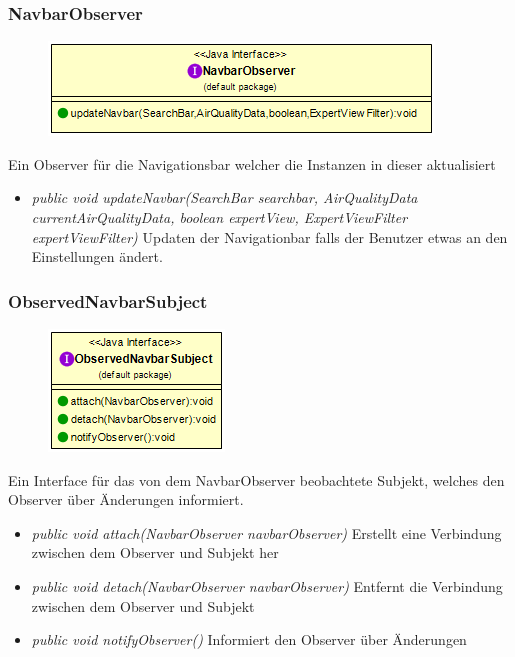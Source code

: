 \subsubsection{NavbarObserver}
\begin{minipage}{0.3\textwidth}
    \begin{figure}[H]
        \includegraphics[scale = 0.5
        ]{media/view/view/NavbarObserver_Class.png}
    \end{figure}
    \end{minipage} \hfill
    \begin{minipage}{0.6\textwidth}
Ein Observer für die Navigationsbar welcher die Instanzen in dieser aktualisiert
\end{minipage}
\begin{itemize} [noitemsep]
    \item \emph{public void updateNavbar(SearchBar searchbar, AirQualityData currentAirQualityData,
    boolean expertView, ExpertViewFilter expertViewFilter)} Updaten der Navigationbar falls der Benutzer etwas an den Einstellungen ändert.
\end{itemize}

\subsubsection{ObservedNavbarSubject}
\begin{minipage}{0.3\textwidth}
    \begin{figure}[H]
        \includegraphics[scale = 0.5
        ]{media/view/view/ObservedNavbarSubject_Class.png}
    \end{figure}
    \end{minipage} \hfill
    \begin{minipage}{0.6\textwidth}
Ein Interface für das von dem NavbarObserver beobachtete Subjekt, welches den Observer über Änderungen informiert.
\end{minipage}
\begin{itemize} [noitemsep]
    \item \emph{public void attach(NavbarObserver navbarObserver)} Erstellt eine Verbindung zwischen dem Observer und Subjekt her
    \item \emph{public void detach(NavbarObserver navbarObserver)} Entfernt die Verbindung zwischen dem Observer und Subjekt
    \item \emph{public void notifyObserver()} Informiert den Observer über Änderungen
\end{itemize}

